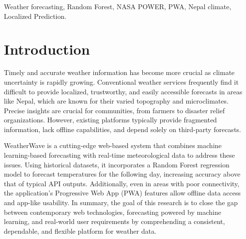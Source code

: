 \documentclass[conference]{IEEEtran}
\begin{document}
\begin{abstract}
Accurate and accessible weather information is critical for decision-making in regions characterized by complex terrain and climatic variability. This paper presents \textit{WeatherWave}, a machine learning--enhanced web application for localized weather forecasting across Nepal. The system integrates real-time meteorological data from external weather APIs with a Random Forest regression model trained on \textbf{NASA POWER satellite-derived reanalysis data} covering all 77 administrative districts of Nepal.
Experimental evaluation on a held-out test set of 24,187 samples shows that the proposed Random Forest model achieves a Mean Absolute Error (MAE) of $0.424\,^\circ\text{C}$, RMSE of $0.695\,^\circ\text{C}$, and an $R^2$ score of $0.9934$. This high predictive performance is attributed in part to strong short-term temperature persistence characteristic of \textbf{Nepal's continental climate zones}. Comparative and statistical analyses demonstrate that the model significantly outperforms standard API-based persistence forecasting across districts. The results highlight the feasibility of combining lightweight machine learning models with modern web architectures to deliver accurate, localized, and accessible weather information for geographically diverse regions.
\end{abstract}

\begin{IEEEkeywords}
Weather forecasting, Random Forest, NASA POWER, PWA, Nepal climate, Localized Prediction.
\end{IEEEkeywords}

\section{Introduction}
Timely and accurate weather information has become more crucial as climate uncertainty is rapidly growing. Conventional weather services frequently find it difficult to provide localized, trustworthy, and easily accessible forecasts in areas like Nepal, which are known for their varied topography and microclimates. Precise insights are crucial for communities, from farmers to disaster relief organizations. However, existing platforms typically provide fragmented information, lack offline capabilities, and depend solely on third-party forecasts.


WeatherWave is a cutting-edge web-based system that combines machine learning-based forecasting with real-time meteorological data to address these issues. Using historical datasets, it incorporates a Random Forest regression model to forecast temperatures for the following day, increasing accuracy above that of typical API outputs.  Additionally, even in areas with poor connectivity, the application's Progressive Web App (PWA) features allow offline data access and app-like usability.
 In summary, the goal of this research is to close the gap between contemporary web technologies, forecasting powered by machine learning, and real-world user requirements by comprehending a consistent, dependable, and flexible platform for weather data.
\end{document}
